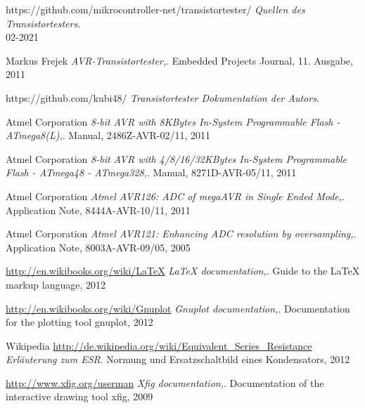 \documentclass[pdftex,12pt,a4paper,oneside,english]{report}
\DeclareRobustCommand{\_}{\ifmmode{\rule{1ex}{.4pt}}\else\textunderscore\hspace{0pt}\fi}
\begin{document}












 
 
 
 
 
 






\begin{thebibliography}{99}

https://github.com/mikrocontroller-net/transistortester/
\emph{Quellen des Transistortesters}. 
\\ 02-2021

Markus Frejek
\emph{AVR-Transistortester,}.
Embedded Projects Journal,
11. Ausgabe,
2011

https://github.com/kubi48/
\emph{Transistortester Dokumentation der Autors}.

Atmel Corporation
\emph{8-bit AVR with 8KBytes In-System Programmable Flash - ATmega8(L),}.
Manual,
2486Z-AVR-02/11,
2011

Atmel Corporation
\emph{8-bit AVR with 4/8/16/32KBytes In-System Programmable Flash - ATmega48 - ATmega328,}.
Manual,
8271D-AVR-05/11,
2011

Atmel Corporation
\emph{Atmel AVR126: ADC of megaAVR in Single Ended Mode,}.
Application Note,
8444A-AVR-10/11,
2011

Atmel Corporation
\emph{Atmel AVR121: Enhancing ADC resolution by oversampling,}.
Application Note,
8003A-AVR-09/05,
2005

\url{http://en.wikibooks.org/wiki/LaTeX}
\emph{LaTeX documentation,}.
Guide to the LaTeX markup language,
2012

\url{http://en.wikibooks.org/wiki/Gnuplot}
\emph{Gnuplot documentation,}.
Documentation for the plotting tool gnuplot,
2012

Wikipedia
\url{http://de.wikipedia.org/wiki/Equivalent_Series_Resistance}
\emph{Erläuterung zum ESR}.
Normung und Ersatzschaltbild eines Kondensators,
2012

\url{http://www.xfig.org/userman}
\emph{Xfig documentation,}.
Documentation of the interactive drawing tool xfig,
2009


\end{thebibliography}
\end{document}
